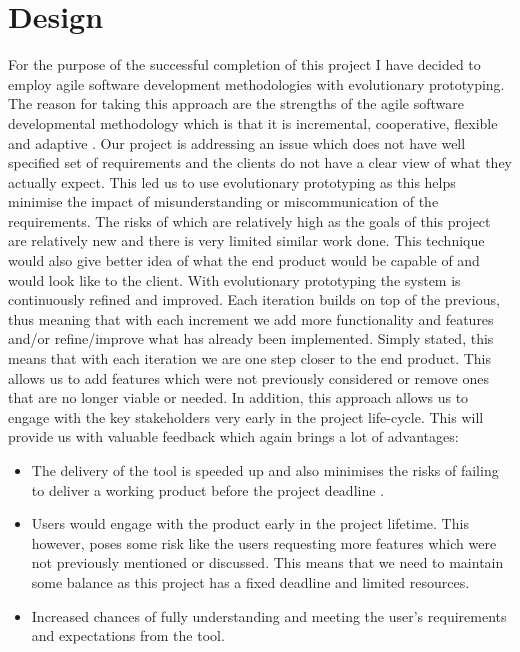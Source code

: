 \chapter{Design}
For the purpose of the successful completion of this project I have decided to employ agile software development methodologies with evolutionary prototyping. The reason for taking this approach are the strengths of the agile software developmental methodology which is that it is incremental, cooperative, flexible and adaptive \cite{4147390}. Our project is addressing an issue which does not have well specified set of requirements and the clients do not have a clear view of what they actually expect. This led us to use  evolutionary prototyping \cite{Connell89} as this helps minimise the impact of misunderstanding or miscommunication of the requirements. The risks of which are relatively high as the goals of this project are relatively new and there is very limited similar work done. This technique would also give better idea of what the end product would be capable of and would look like to the client. With evolutionary prototyping the system is continuously refined and improved. Each iteration builds on top of the previous, thus meaning that with each increment we add more functionality and features and/or refine/improve what has already been implemented. Simply stated, this means that with each iteration we are one step closer to the end product. This allows us to add features which were not previously considered or remove ones that are no longer viable or needed. In addition, this approach allows us to engage with the key stakeholders very early in the project life-cycle. This will provide us with valuable feedback which again brings a lot of advantages:

\begin{itemize}
	\item The delivery of the tool is speeded up and also minimises the risks of failing to deliver a working product before the project deadline \cite{Connell89}.
	\item Users would engage with the product early in the project lifetime. This however, poses some risk like the users requesting more features which were not previously mentioned or discussed. This means that we need to maintain some balance as this project has a fixed deadline and limited resources.
	\item Increased chances of fully understanding and meeting the user's requirements and expectations from the tool.
\end{itemize}

